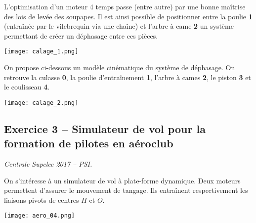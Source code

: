 

L'optimisation d'un moteur 4 temps passe (entre autre) par une bonne maîtrise des lois de levée des soupapes. Il est ainsi possible de positionner entre la poulie \textbf{1} (entraînée par le vilebrequin via une chaîne) et l'arbre à came  \textbf{2} un système permettant de créer un déphasage entre ces pièces. 

\begin{marginfigure}
\texttt{[image: calage\_1.png]}
\end{marginfigure}

On propose ci-dessous un modèle cinématique du système de déphasage. On retrouve la culasse \textbf{0}, la poulie d’entraînement \textbf{1}, l'arbre à cames \textbf{2}, le piston \textbf{3} et le coulisseau \textbf{4}. 


\begin{center}
\texttt{[image: calage\_2.png]}
\end{center}

\ifprof
\begin{corrige}
\end{corrige}\else\fi

\ifprof
\begin{corrige}
\end{corrige}\else\fi

\subsection*{Exercice 3 -- Simulateur de vol pour la formation de pilotes en aéroclub}


\begin{flushright}
\textit{Centrale Supelec 2017 -- PSI.}
\end{flushright}
On s’intéresse à un simulateur de vol à plate-forme dynamique. 
%
Deux moteurs permettent d'assurer le mouvement de tangage.  Ils entraînent respectivement les liaisons pivots de centres $H$ et $O$. 

\begin{marginfigure}
\texttt{[image: aero\_04.png]}
\end{marginfigure}

